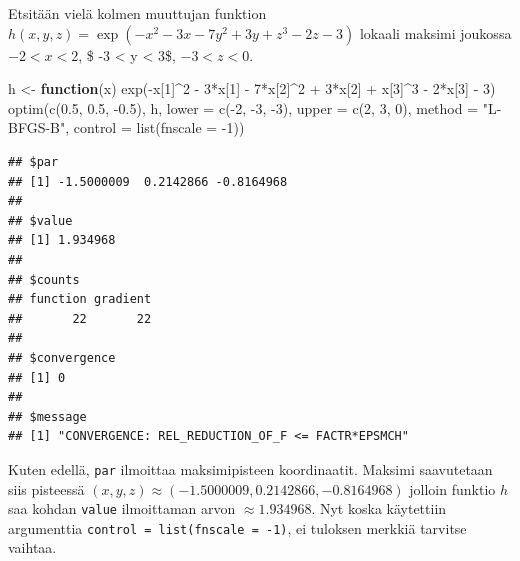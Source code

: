 \documentclass[
]{book}
\newenvironment{Shaded}{\begin{snugshade}}{\end{snugshade}}
\newcommand{\AttributeTok}[1]{\textcolor[rgb]{0.77,0.63,0.00}{#1}}
\newcommand{\ControlFlowTok}[1]{\textcolor[rgb]{0.13,0.29,0.53}{\textbf{#1}}}
\newcommand{\DecValTok}[1]{\textcolor[rgb]{0.00,0.00,0.81}{#1}}
\newcommand{\FloatTok}[1]{\textcolor[rgb]{0.00,0.00,0.81}{#1}}
\newcommand{\FunctionTok}[1]{\textcolor[rgb]{0.00,0.00,0.00}{#1}}
\newcommand{\NormalTok}[1]{#1}
\newcommand{\OtherTok}[1]{\textcolor[rgb]{0.56,0.35,0.01}{#1}}
\newcommand{\SpecialCharTok}[1]{\textcolor[rgb]{0.00,0.00,0.00}{#1}}
\newcommand{\StringTok}[1]{\textcolor[rgb]{0.31,0.60,0.02}{#1}}
\begin{document}
Etsitään vielä kolmen muuttujan funktion \(h(x,y,z) = \exp(-x^2-3x-7y^2+3y+z^3-2z-3)\) lokaali maksimi joukossa \(-2 < x < 2\), \$ -3 \textless{} y \textless{} 3\$, \(-3 < z < 0\).

\begin{Shaded}
\begin{Highlighting}[]
\NormalTok{h }\OtherTok{\textless{}{-}} \ControlFlowTok{function}\NormalTok{(x) }\FunctionTok{exp}\NormalTok{(}\SpecialCharTok{{-}}\NormalTok{x[}\DecValTok{1}\NormalTok{]}\SpecialCharTok{\^{}}\DecValTok{2} \SpecialCharTok{{-}} \DecValTok{3}\SpecialCharTok{*}\NormalTok{x[}\DecValTok{1}\NormalTok{] }\SpecialCharTok{{-}} \DecValTok{7}\SpecialCharTok{*}\NormalTok{x[}\DecValTok{2}\NormalTok{]}\SpecialCharTok{\^{}}\DecValTok{2} \SpecialCharTok{+} \DecValTok{3}\SpecialCharTok{*}\NormalTok{x[}\DecValTok{2}\NormalTok{] }\SpecialCharTok{+}\NormalTok{ x[}\DecValTok{3}\NormalTok{]}\SpecialCharTok{\^{}}\DecValTok{3} \SpecialCharTok{{-}} \DecValTok{2}\SpecialCharTok{*}\NormalTok{x[}\DecValTok{3}\NormalTok{] }\SpecialCharTok{{-}} \DecValTok{3}\NormalTok{)}
\FunctionTok{optim}\NormalTok{(}\FunctionTok{c}\NormalTok{(}\FloatTok{0.5}\NormalTok{, }\FloatTok{0.5}\NormalTok{, }\SpecialCharTok{{-}}\FloatTok{0.5}\NormalTok{), h, }\AttributeTok{lower =} \FunctionTok{c}\NormalTok{(}\SpecialCharTok{{-}}\DecValTok{2}\NormalTok{, }\SpecialCharTok{{-}}\DecValTok{3}\NormalTok{, }\SpecialCharTok{{-}}\DecValTok{3}\NormalTok{), }\AttributeTok{upper =} \FunctionTok{c}\NormalTok{(}\DecValTok{2}\NormalTok{, }\DecValTok{3}\NormalTok{, }\DecValTok{0}\NormalTok{), }
      \AttributeTok{method =} \StringTok{"L{-}BFGS{-}B"}\NormalTok{, }\AttributeTok{control =} \FunctionTok{list}\NormalTok{(}\AttributeTok{fnscale =} \SpecialCharTok{{-}}\DecValTok{1}\NormalTok{))}
\end{Highlighting}
\end{Shaded}

\begin{verbatim}
## $par
## [1] -1.5000009  0.2142866 -0.8164968
## 
## $value
## [1] 1.934968
## 
## $counts
## function gradient 
##       22       22 
## 
## $convergence
## [1] 0
## 
## $message
## [1] "CONVERGENCE: REL_REDUCTION_OF_F <= FACTR*EPSMCH"
\end{verbatim}

Kuten edellä, \texttt{par} ilmoittaa maksimipisteen koordinaatit. Maksimi saavutetaan siis pisteessä \((x,y,z) \approx (-1.5000009, 0.2142866, -0.8164968)\) jolloin funktio \(h\) saa kohdan \texttt{value} ilmoittaman arvon \(\approx 1.934968\). Nyt koska käytettiin argumenttia \texttt{control\ =\ list(fnscale\ =\ -1)}, ei tuloksen merkkiä tarvitse vaihtaa.
\end{document}
